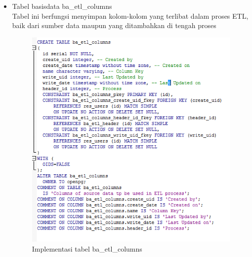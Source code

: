 \begin{itemize}
	\item Tabel basisdata ba\_etl\_columns\\
	Tabel ini berfungsi menyimpan kolom-kolom yang terlibat dalam proses ETL, baik dari sumber data maupun yang ditambahkan di tengah proses
	\begin{figure}[H]
		\centering
		\includegraphics[scale=0.5]{Gambar/tabel-ba-etl-columns}
		\caption{Implementasi tabel ba\_etl\_columns}
		\end{figure}
	

\end{itemize}
